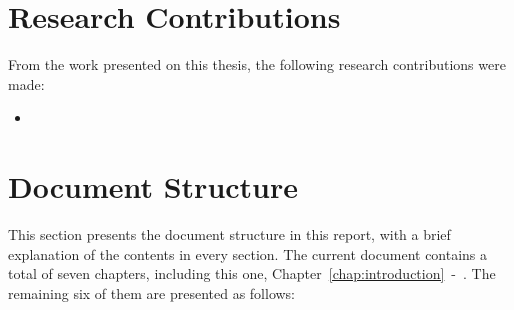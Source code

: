 \section{Research Contributions}
\label{sec:research_contributions}

From the work presented on this thesis, the following research contributions were made:

\begin{itemize}
    \item {}
\end{itemize}

\section{Document Structure}
\label{sec:document_structure}

This section presents the document structure in this report, with a brief explanation of the contents in every section. The current document contains a total of seven chapters, including this one, Chapter~\ref{chap:introduction}~-~. The remaining six of them are presented as follows:

